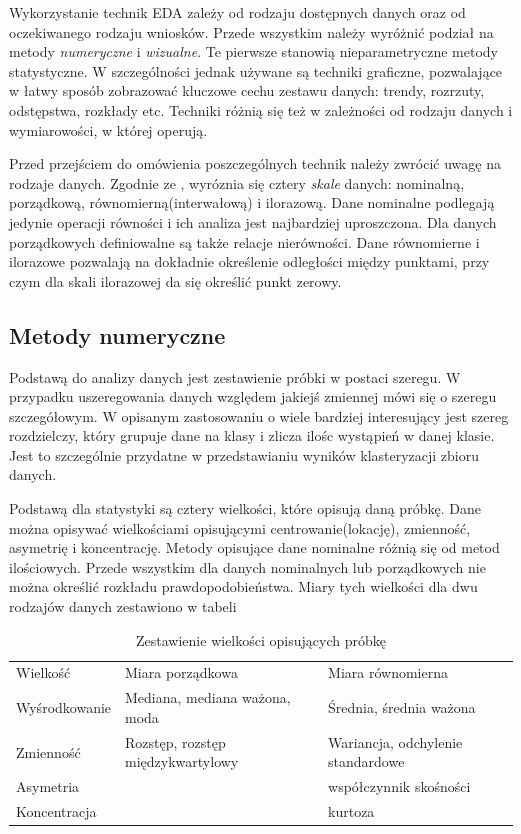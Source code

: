 \documentclass[12pt,a4paper,oneside]{report} %
\begin{document}
Wykorzystanie technik EDA zależy od rodzaju dostępnych danych oraz od oczekiwanego rodzaju wniosków. Przede wszystkim należy wyróżnić podział na metody \emph{numeryczne} i \emph{wizualne}. Te pierwsze stanowią nieparametryczne metody statystyczne. W szczególności jednak używane są techniki graficzne, pozwalające w łatwy sposób zobrazować kluczowe cechu zestawu danych: trendy, rozrzuty, odstępstwa, rozkłady etc. Techniki różnią się też w zależności od rodzaju danych i wymiarowości, w której operują.\par

Przed przejściem do omówienia poszczególnych technik należy zwrócić uwagę na rodzaje danych. Zgodnie ze \cite{stanisz-1}, wyróznia się cztery \emph{skale} danych: nominalną, porządkową, równomierną(interwałową) i ilorazową. Dane nominalne podlegają jedynie operacji równości i ich analiza jest najbardziej uproszczona. Dla danych porządkowych definiowalne są także relacje nierówności. Dane równomierne i ilorazowe pozwalają na dokładnie określenie odległości między punktami, przy czym dla skali ilorazowej da się określić punkt zerowy.\par

\subsection{Metody numeryczne}

Podstawą do analizy danych jest zestawienie próbki w postaci szeregu. W przypadku uszeregowania danych względem jakiejś zmiennej mówi się o szeregu szczegółowym. W opisanym zastosowaniu o wiele bardziej interesujący jest szereg rozdzielczy, który grupuje dane na klasy i zlicza ilośc wystąpień w danej klasie. Jest to szczególnie przydatne w przedstawianiu wyników klasteryzacji zbioru danych. \par

Podstawą dla statystyki są cztery wielkości, które opisują daną próbkę. Dane można opisywać wielkościami opisującymi centrowanie(lokację), zmienność, asymetrię i koncentrację. \cite{stanisz-1} Metody opisujące dane nominalne różnią się od metod ilościowych. Przede wszystkim dla danych nominalnych lub porządkowych nie można określić rozkładu prawdopodobieństwa. Miary tych wielkości dla dwu rodzajów danych zestawiono w tabeli \cite{miary-statystyczne} 

\begin{table}
\begin{tabular}{l|l|l}
Wielkość & Miara porządkowa & Miara równomierna  \\
Wyśrodkowanie & Mediana, mediana ważona, moda & Średnia, średnia ważona \\
Zmienność & Rozstęp, rozstęp międzykwartylowy & Wariancja, odchylenie standardowe \\
Asymetria &  & współczynnik skośności \\
Koncentracja &  & kurtoza \\
\end{tabular}
\caption{Zestawienie wielkości opisujących próbkę}
\label{miary-statystyczne}
\end{table}
\end{document}
